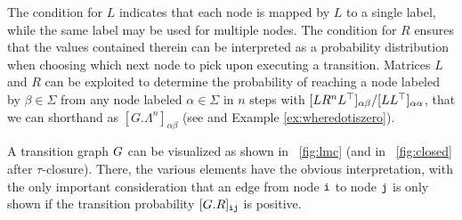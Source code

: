 The condition for $L$ indicates that each node is mapped by $L$ to a single label, while the same label may be used for multiple nodes. The condition for $R$ ensures that the values contained therein can be interpreted as a probability distribution when choosing which next node to pick upon executing a transition. Matrices $L$ and $R$ can be exploited to determine the probability of reaching a node labeled by $\beta\in\Sigma$ from any node labeled $\alpha\in\Sigma$ in $n$ steps with $[LR^nL^\top]_{\alpha\beta}/[LL^\top]_{\alpha\alpha}$, that we can shorthand as $[G.\Lambda^n]_{\alpha\beta}$ (see \cite{GartnerFW03} and Example \ref{ex:wheredotiszero}).

A transition graph $G$ can be visualized as shown in \figurename~\ref{fig:lmc} (and in \figurename~\ref{fig:closed} after $\tau$-closure). There, the various elements have the obvious interpretation, with the only important consideration that an edge from node $\textnormal{\texttt{i}}$ to node $\textnormal{\texttt{j}}$ is only shown if the transition probability $[G.R]_{\textnormal{\texttt{i}}\textnormal{\texttt{j}}}$ is positive.

%



